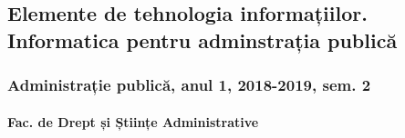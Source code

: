\documentclass[
]{article}
\date{}
\let\oldparagraph\paragraph
\renewcommand{\paragraph}[1]{\oldparagraph{#1}\mbox{}}
\begin{document}
\hypertarget{elemente-de-tehnologia-informaux21biilor.-informatica-pentru-adminstraux21bia-publicux103}{%
\subsection{Elemente de tehnologia informațiilor. Informatica pentru
adminstrația
publică}\label{elemente-de-tehnologia-informaux21biilor.-informatica-pentru-adminstraux21bia-publicux103}}

\hypertarget{administraux21bie-publicux103-anul-1-2018-2019-sem.-2}{%
\subsubsection{Administrație publică, anul 1, 2018-2019, sem.
2}\label{administraux21bie-publicux103-anul-1-2018-2019-sem.-2}}

\hypertarget{fac.-de-drept-ux219i-ux219tiinux21be-administrative}{%
\paragraph{Fac. de Drept și Științe
Administrative}\label{fac.-de-drept-ux219i-ux219tiinux21be-administrative}}
\end{document}
